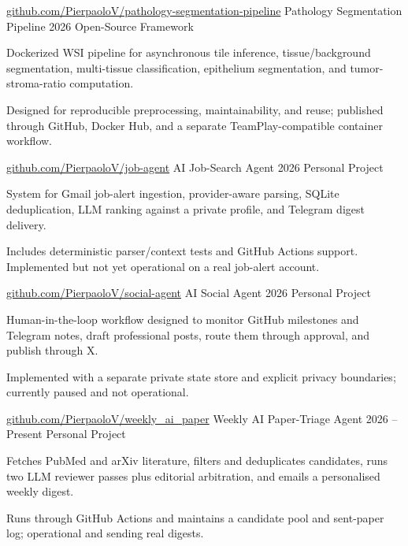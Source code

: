 
\begin{cventries}
\cventry
  {\href{https://github.com/PierpaoloV/pathology-segmentation-pipeline}{github.com/PierpaoloV/pathology-segmentation-pipeline}}
  {Pathology Segmentation Pipeline}
  {2026}
  {Open-Source Framework}
  {
    \begin{cvitems}
      \item {Dockerized WSI pipeline for asynchronous tile inference, tissue/background segmentation, multi-tissue classification, epithelium segmentation, and tumor-stroma-ratio computation.}
      \item {Designed for reproducible preprocessing, maintainability, and reuse; published through GitHub, Docker Hub, and a separate TeamPlay-compatible container workflow.}
    \end{cvitems}
  }

\cventry
  {\href{https://github.com/PierpaoloV/job-agent}{github.com/PierpaoloV/job-agent}}
  {AI Job-Search Agent}
  {2026}
  {Personal Project}
  {
    \begin{cvitems}
      \item {System for Gmail job-alert ingestion, provider-aware parsing, SQLite deduplication, LLM ranking against a private profile, and Telegram digest delivery.}
      \item {Includes deterministic parser/context tests and GitHub Actions support. Implemented but not yet operational on a real job-alert account.}
    \end{cvitems}
  }

\cventry
  {\href{https://github.com/PierpaoloV/social-agent}{github.com/PierpaoloV/social-agent}}
  {AI Social Agent}
  {2026}
  {Personal Project}
  {
    \begin{cvitems}
      \item {Human-in-the-loop workflow designed to monitor GitHub milestones and Telegram notes, draft professional posts, route them through approval, and publish through X.}
      \item {Implemented with a separate private state store and explicit privacy boundaries; currently paused and not operational.}
    \end{cvitems}
  }

\cventry
  {\href{https://github.com/PierpaoloV/weekly_ai_paper}{github.com/PierpaoloV/weekly\_ai\_paper}}
  {Weekly AI Paper-Triage Agent}
  {2026 -- Present}
  {Personal Project}
  {
    \begin{cvitems}
      \item {Fetches PubMed and arXiv literature, filters and deduplicates candidates, runs two LLM reviewer passes plus editorial arbitration, and emails a personalised weekly digest.}
      \item {Runs through GitHub Actions and maintains a candidate pool and sent-paper log; operational and sending real digests.}
    \end{cvitems}
  }


\end{cventries}
